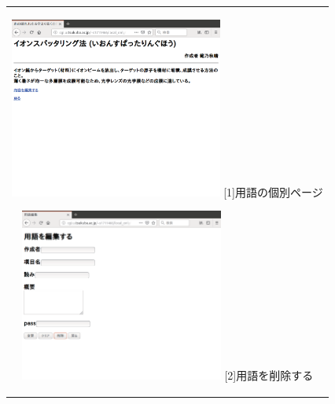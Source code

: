 \documentclass[12pt,a4paper]{jarticle}
\begin{document}
\begin{ttfamily}
\begin{figure}[htbp]
\begin{center}
\begin{tabular}{c}
      \begin{minipage}{0.55\hsize}
        \begin{center}
          \includegraphics[width=7.0cm]{10-3-16.eps}
          \hspace{1.6cm} [1]用語の個別ページ
        \end{center}
      \end{minipage}

      \begin{minipage}{0.55\hsize}
        \begin{center}
          \includegraphics[width=6.7cm]{10-3-17.eps}
          \hspace{1.6cm} [2]用語を削除する
        \end{center}
      \end{minipage}

      \begin{minipage}{0.55\hsize}
        \vspace{30mm}
      \end{minipage} \\
 

\end{tabular}
\end{center}
\end{figure}
\end{ttfamily}
\end{document}
